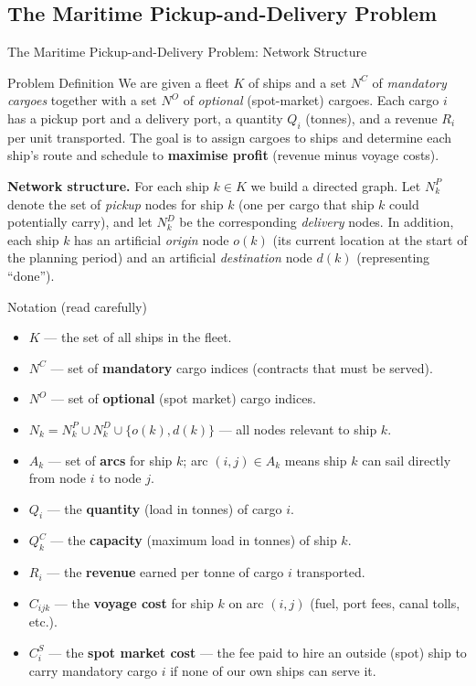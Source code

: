\documentclass[aspectratio=169,10pt]{beamer}
\begin{document}
\subsection{The Maritime Pickup-and-Delivery Problem}

\begin{frame}[allowframebreaks]{The Maritime Pickup-and-Delivery Problem: Network Structure}
  \begin{block}{Problem Definition}
    We are given a fleet $K$ of ships and a set $N^C$ of \emph{mandatory
    cargoes} together with a set $N^O$ of \emph{optional} (spot-market)
    cargoes.  Each cargo $i$ has a pickup port and a delivery port, a
    quantity $Q_i$ (tonnes), and a revenue $R_i$ per unit transported.
    The goal is to assign cargoes to ships and determine each ship's route
    and schedule to \textbf{maximise profit} (revenue minus voyage costs).
  \end{block}

  \medskip
  \textbf{Network structure.}  For each ship $k \in K$ we build a directed
  graph.  Let $N_k^P$ denote the set of \emph{pickup} nodes for ship $k$
  (one per cargo that ship $k$ could potentially carry), and let $N_k^D$
  be the corresponding \emph{delivery} nodes.  In addition, each ship $k$
  has an artificial \emph{origin} node $o(k)$ (its current location at the
  start of the planning period) and an artificial \emph{destination} node
  $d(k)$ (representing ``done'').

  \medskip
  \begin{block}{Notation (read carefully)}
    \begin{itemize}
      \item $K$ --- the set of all ships in the fleet.
      \item $N^C$ --- set of \textbf{mandatory} cargo indices (contracts that must be served).
      \item $N^O$ --- set of \textbf{optional} (spot market) cargo indices.
      \item $N_k = N_k^P \cup N_k^D \cup \{o(k), d(k)\}$ --- all nodes
            relevant to ship $k$.
      \item $A_k$ --- set of \textbf{arcs} for ship $k$; arc $(i,j) \in A_k$
            means ship $k$ can sail directly from node $i$ to node $j$.
      \item $Q_i$ --- the \textbf{quantity} (load in tonnes) of cargo $i$.
      \item $Q_k^C$ --- the \textbf{capacity} (maximum load in tonnes) of ship $k$.
      \item $R_i$ --- the \textbf{revenue} earned per tonne of cargo $i$ transported.
      \item $C_{ijk}$ --- the \textbf{voyage cost} for ship $k$ on arc $(i,j)$
            (fuel, port fees, canal tolls, etc.).
      \item $C_i^S$ --- the \textbf{spot market cost} --- the fee paid to hire
            an outside (spot) ship to carry mandatory cargo $i$ if none of
            our own ships can serve it.
    \end{itemize}
  \end{block}


\end{frame}
\end{document}
